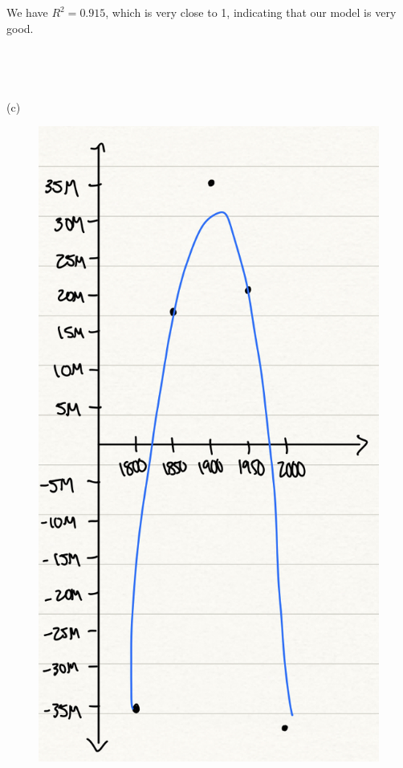 \documentclass[12pt, letterpaper]{report}
\begin{document}
\indent We have $R^2 = 0.915$, which is very close to 1, indicating that our model is very good.\\\\
\\\\\\
\indent (c)
\begin{figure}[h!]
  \includegraphics[scale=0.25]{./images/residual_graph.jpeg}
\end{figure}\\
\end{document}
